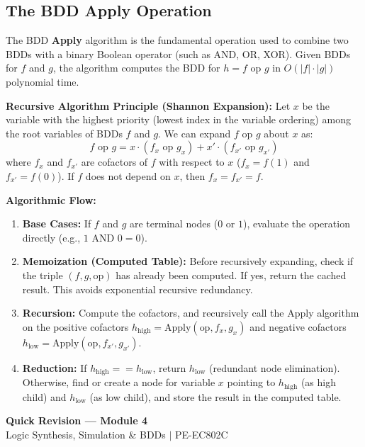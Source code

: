 \documentclass[12pt,a4paper]{article}
\begin{document}
\subsection{The BDD Apply Operation}
The BDD \textbf{Apply} algorithm is the fundamental operation used to combine two BDDs with a binary Boolean operator (such as AND, OR, XOR). Given BDDs for $f$ and $g$, the algorithm computes the BDD for $h = f \text{ op } g$ in $O(|f| \cdot |g|)$ polynomial time.

\textbf{Recursive Algorithm Principle (Shannon Expansion):}
Let $x$ be the variable with the highest priority (lowest index in the variable ordering) among the root variables of BDDs $f$ and $g$. We can expand $f \text{ op } g$ about $x$ as:
\begin{equation}
  f \text{ op } g = x \cdot (f_x \text{ op } g_x) + x' \cdot (f_{x'} \text{ op } g_{x'})
\end{equation}
where $f_x$ and $f_{x'}$ are cofactors of $f$ with respect to $x$ ($f_x = f(1)$ and $f_{x'} = f(0)$). If $f$ does not depend on $x$, then $f_x = f_{x'} = f$.

\textbf{Algorithmic Flow:}
\begin{enumerate}[leftmargin=*, itemsep=2pt]
  \item \textbf{Base Cases:} If $f$ and $g$ are terminal nodes ($0$ or $1$), evaluate the operation directly (e.g., $1 \text{ AND } 0 = 0$).
  \item \textbf{Memoization (Computed Table):} Before recursively expanding, check if the triple $(f, g, \text{op})$ has already been computed. If yes, return the cached result. This avoids exponential recursive redundancy.
  \item \textbf{Recursion:} Compute the cofactors, and recursively call the Apply algorithm on the positive cofactors $h_{\text{high}} = \text{Apply}(\text{op}, f_x, g_x)$ and negative cofactors $h_{\text{low}} = \text{Apply}(\text{op}, f_{x'}, g_{x'})$.
  \item \textbf{Reduction:} If $h_{\text{high}} == h_{\text{low}}$, return $h_{\text{low}}$ (redundant node elimination). Otherwise, find or create a node for variable $x$ pointing to $h_{\text{high}}$ (as high child) and $h_{\text{low}}$ (as low child), and store the result in the computed table.
\end{enumerate}

\newpage

\begin{center}
  {\large\bfseries\color{myred} Quick Revision — Module 4}\\[3pt]
  {\small\color{mydark} Logic Synthesis, Simulation \& BDDs $|$ PE-EC802C}
\end{center}
\noindent{\color{myred}\rule{\linewidth}{1.2pt}}
\vspace{8pt}
\end{document}
